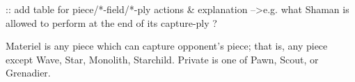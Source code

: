 \clearpage %

\TODO :: add table for piece/*-field/*-ply actions \& explanation
      --\textgreater e.g. what Shaman is allowed to perform at the end of its capture-ply ?

Materiel is any piece which can capture opponent's piece; that is, any piece except Wave, Star, Monolith, Starchild.
Private is one of Pawn, Scout, or Grenadier.


